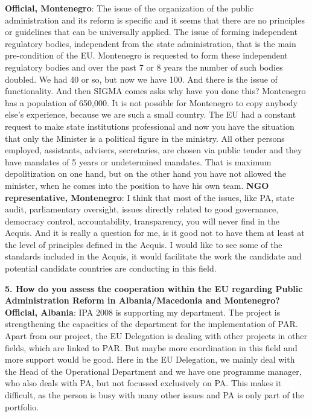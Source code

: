 \textbf{Official, Montenegro}: The issue of the organization of the public administration and its reform is specific and it seems that there are no principles or guidelines that can be universally applied. The issue of forming independent regulatory bodies, independent from the state administration, that is the main pre-condition of the EU. Montenegro is requested to form these independent regulatory bodies and over the past 7 or 8 years the number of such bodies doubled. We had 40 or so, but now we have 100. And there is the issue of functionality. And then SIGMA comes asks why have you done this? Montenegro has a population of 650,000. It is not possible for Montenegro to copy anybody else’s experience, because we are such a small country. The EU had a constant request to make state institutions professional and now you have the situation that only the Minister is a political figure in the ministry. All other persons employed, assistants, advisers, secretaries, are chosen via public tender and they have mandates of 5 years or undetermined mandates. That is maximum depolitization on one hand, but on the other hand you have not allowed the minister, when he comes into the position to have his own team. 
\textbf{NGO representative, Montenegro}: I think that most of the issues, like PA, state audit, parliamentary oversight, issues directly related to good governance, democracy control, accountability, transparency, you will never find in the Acquis. And it is really a question for me, is it good not to have them at least at the level of principles defined in the Acquis. I would like to see some of the standards included in the Acquis, it would facilitate the work the candidate and potential candidate countries are conducting in this field.\newpage
\textbf{5. How do you assess the cooperation within the EU regarding Public Administration Reform in Albania/Macedonia and Montenegro?}\\
\textbf{Official, Albania}: IPA 2008 is supporting my department. The project is strengthening the capacities of the department for the implementation of PAR. Apart from our project, the EU Delegation is dealing with other projects in other fields, which are linked to PAR. But maybe more coordination in this field and more support would be good. Here in the EU Delegation, we mainly deal with the Head of the Operational Department and we have one programme manager, who also deals with PA, but not focussed exclusively on PA. This makes it difficult, as the person is busy with many other issues and PA is only part of the portfolio.
